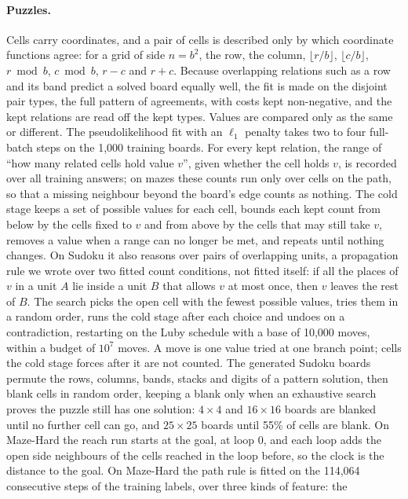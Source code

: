 \documentclass[10pt]{article}
\begin{document}
\paragraph{Puzzles.} Cells carry coordinates, and a pair of cells is described only by which coordinate functions agree:
for a grid of side $n=b^2$, the row, the column, $\lfloor r/b\rfloor$, $\lfloor c/b\rfloor$, $r \bmod b$, $c \bmod b$,
$r-c$ and $r+c$. Because overlapping relations such as a row and its band predict a solved board equally well, the fit
is made on the disjoint pair types, the full pattern of agreements, with costs kept non-negative, and the kept relations
are read off the kept types. Values are compared only as the same or different. The pseudolikelihood fit with an
$\ell_1$ penalty takes two to four full-batch steps on the 1,000 training boards. For every kept
relation, the range of ``how many related cells hold value $v$'', given whether the cell holds $v$, is recorded over all
training answers; on mazes these counts run only over cells on the path, so that a missing neighbour beyond the board's
edge counts as nothing. The cold stage keeps a set of possible values for each cell, bounds each kept count from below
by the cells fixed to $v$ and from above by the cells that may still take $v$, removes a value when a range can no
longer be met, and repeats until nothing changes. On Sudoku it also reasons over pairs of overlapping units, a propagation
rule we wrote over two fitted count conditions, not fitted itself: if all the places of $v$ in a unit $A$ lie inside a
unit $B$ that allows $v$ at most once, then $v$ leaves the rest of $B$. The search picks the open cell with the fewest possible values, tries them in a random order, runs
the cold stage after each choice and undoes on a contradiction, restarting on the Luby schedule\cite{luby1993optimal}
with a base of 10,000 moves, within a budget of $10^{7}$ moves. A move is one value tried at one branch
point; cells the cold stage forces after it are not counted. The generated Sudoku boards permute the rows, columns,
bands, stacks and digits of a pattern solution, then blank cells in random order, keeping a blank only when an exhaustive
search proves the puzzle still has one solution: $4\times4$ and $16\times16$ boards are blanked until no further cell
can go, and $25\times25$ boards until 55\% of cells are blank. On Maze-Hard the reach run starts at the
goal, at loop 0, and each loop adds the open side neighbours of the cells reached in the loop before, so the clock is the
distance to the goal. On Maze-Hard the
path rule is fitted on the 114,064 consecutive steps of the training labels, over three kinds of feature: the
\end{document}
